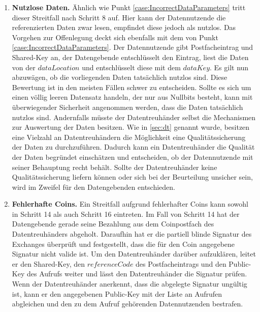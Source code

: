 \documentclass[
	fontsize=12pt,
	headings=small,
	parskip=half,           %
	bibliography=totoc,
	numbers=noenddot,       %
	open=any,               %
]{scrreprt}
\begin{document}
\begin{enumerate}
    \item \textbf{Nutzlose Daten.}\label{case:UselessData}
    Ähnlich wie Punkt \ref{case:IncorrectDataParameters} tritt dieser Streitfall nach Schritt 8 auf. Hier kann der Datennutzende die referenzierten Daten zwar lesen, empfindet diese jedoch als nutzlos. Das Vorgehen zur Offenlegung deckt sich ebenfalls mit dem von Punkt \ref{case:IncorrectDataParameters}. Der Datennutzende gibt Postfacheintrag und Shared-Key an, der Datengebende entschlüsselt den Eintrag, liest die Daten von der $dataLocation$ und entschlüsselt diese mit dem $dataKey$. Es gilt nun abzuwägen, ob die vorliegenden Daten tatsächlich nutzlos sind. Diese Bewertung ist in den meisten Fällen schwer zu entscheiden. Sollte es sich um einen völlig leeren Datensatz handeln, der nur aus Nullbits besteht, kann mit überwiegender Sicherheit angenommen werden, dass die Daten tatsächlich nutzlos sind. Andernfalls müsste der Datentreuhänder selbst die Mechanismen zur Auswertung der Daten besitzen. Wie in \ref{sec:dt} genannt wurde, besitzen eine Vielzahl an Datentreuhändern die Möglichkeit eine Qualitätssicherung der Daten zu durchzuführen. Dadurch kann ein Datentreuhänder die Qualität der Daten begründet einschätzen und entscheiden, ob der Datennutzende mit seiner Behauptung recht behält. Sollte der Datentreuhänder keine Qualitätssicherung liefern können oder sich bei der Beurteilung unsicher sein, wird im Zweifel für den Datengebenden entschieden.

    \item \textbf{Fehlerhafte Coins.}\label{case:IncorrectCoins}
    Ein Streitfall aufgrund fehlerhafter Coins kann sowohl in Schritt 14 als auch Schritt 16 eintreten. Im Fall von Schritt 14 hat der Datengebende gerade seine Bezahlung aus dem Coinpostfach des Datentreuhänders abgeholt. Daraufhin hat er die partiell blinde Signatur des Exchanges überprüft und festgestellt, dass die für den Coin angegebene Signatur nicht valide ist. Um den Datentreuhänder darüber aufzuklären, leitet er den Shared-Key, den $referenceCode$ des Postfacheintrags und den Public-Key des Aufrufs weiter und lässt den Datentreuhänder die Signatur prüfen. Wenn der Datentreuhänder anerkennt, dass die abgelegte Signatur ungültig ist, kann er den angegebenen Public-Key mit der Liste an Aufrufen abgleichen und den zu dem Aufruf gehörenden Datennutzenden bestrafen.\\
    

\end{enumerate}
\end{document}

